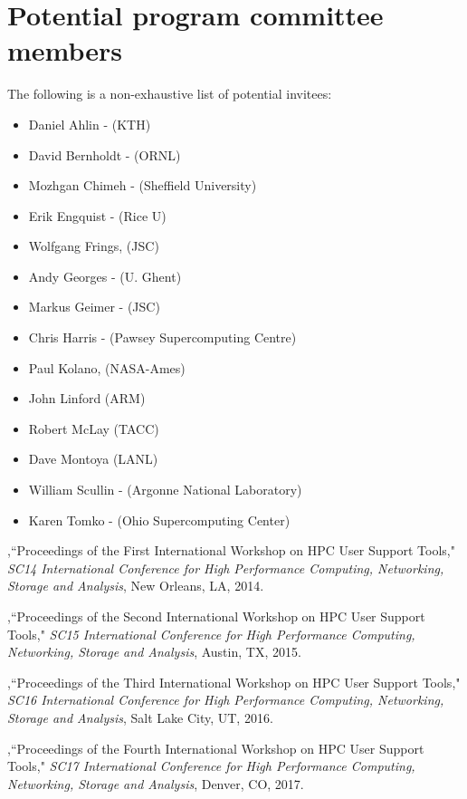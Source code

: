\documentclass[a4paper,10pt]{article}
\begin{document}
\section*{Potential program committee members}
The following is a non-exhaustive list of potential invitees:
  \begin{multicols}{3}\footnotesize
    \begin{itemize}
        \item Daniel Ahlin - (KTH)
        \item David Bernholdt - (ORNL)
        \item Mozhgan Chimeh - (Sheffield University)
	\item Erik Engquist - (Rice U)
        \item Wolfgang Frings, (JSC)
        \item Andy Georges - (U. Ghent)
	\item Markus Geimer - (JSC)        
        \item Chris Harris - (Pawsey Supercomputing Centre)
	\item Paul Kolano, (NASA-Ames)
        \item John Linford (ARM)
        \item Robert McLay (TACC)
        \item Dave Montoya (LANL) 
        \item William Scullin - (Argonne National Laboratory)
	\item Karen Tomko - (Ohio Supercomputing Center)
    \end{itemize}
  \end{multicols}

\begin{thebibliography}{4}

,``Proceedings of the First International Workshop on HPC User Support Tools," \emph{ SC14 International Conference for High Performance Computing, Networking, Storage and Analysis}, New Orleans, LA, 2014.

,``Proceedings of the Second International Workshop on HPC User Support Tools," \emph{ SC15 International Conference for High Performance Computing, Networking, Storage and Analysis}, Austin, TX, 2015.

,``Proceedings of the Third International Workshop on HPC User Support Tools," \emph{ SC16 International Conference for High Performance Computing, Networking, Storage and Analysis}, Salt Lake City, UT, 2016.

,``Proceedings of the Fourth International Workshop on HPC User Support Tools," \emph{ SC17 International Conference for High Performance Computing, Networking, Storage and Analysis}, Denver, CO, 2017.
\end{thebibliography}
\end{document}
